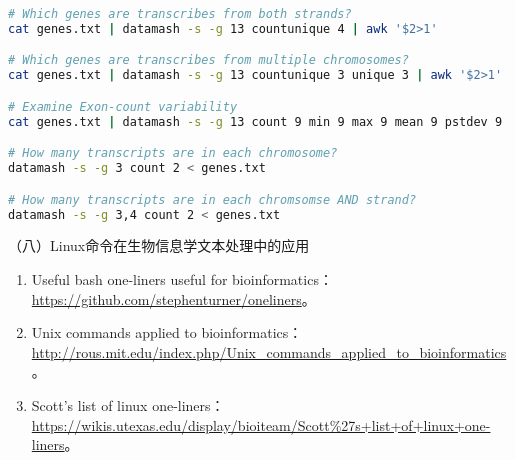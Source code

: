 \begin{enumerate}
\begin{enumerate}
\begin{lstlisting}[language=bash]
# Which genes are transcribes from both strands? 
cat genes.txt | datamash -s -g 13 countunique 4 | awk '$2>1'

# Which genes are transcribes from multiple chromosomes? 
cat genes.txt | datamash -s -g 13 countunique 3 unique 3 | awk '$2>1'

# Examine Exon-count variability
cat genes.txt | datamash -s -g 13 count 9 min 9 max 9 mean 9 pstdev 9 | awk '$2>1'

# How many transcripts are in each chromosome?
datamash -s -g 3 count 2 < genes.txt

# How many transcripts are in each chromsomse AND strand?
datamash -s -g 3,4 count 2 < genes.txt
\end{lstlisting}
    \end{enumerate}
\end{enumerate}

\vspace{0.1in}
（八）Linux命令在生物信息学文本处理中的应用
\begin{enumerate}
  \item Useful bash one-liners useful for bioinformatics：\\ \href{https://github.com/stephenturner/oneliners}{https://github.com/stephenturner/oneliners}。
  \item Unix commands applied to bioinformatics：\\ \href{http://rous.mit.edu/index.php/Unix\_commands\_applied\_to\_bioinformatics}{http://rous.mit.edu/index.php/Unix\_commands\_applied\_to\_bioinformatics}。
  \item Scott's list of linux one-liners：\\ \href{https://wikis.utexas.edu/display/bioiteam/Scott\%27s+list+of+linux+one-liners}{https://wikis.utexas.edu/display/bioiteam/Scott\%27s+list+of+linux+one-liners}。
\end{enumerate}

